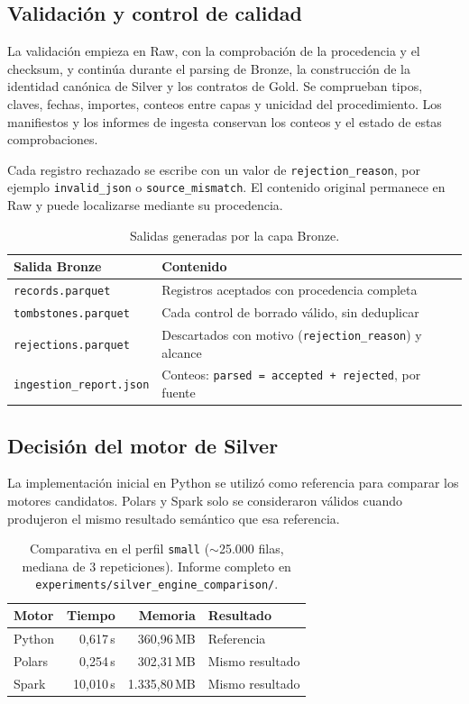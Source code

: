 \documentclass[11pt,a4paper]{article}
\newcommand{\cabecera}[1]{{\bfseries #1}}
\begin{document}
\subsection{Validación y control de calidad}

La validación empieza en Raw, con la comprobación de la procedencia y el
checksum, y continúa durante el parsing de Bronze, la construcción de la
identidad canónica de Silver y los contratos de Gold. Se comprueban tipos,
claves, fechas, importes, conteos entre capas y unicidad del procedimiento.
Los manifiestos y los informes de ingesta conservan los conteos y el estado de
estas comprobaciones.

Cada registro rechazado se escribe con un valor de
\texttt{rejection\_reason}, por ejemplo \texttt{invalid\_json} o
\texttt{source\_mismatch}. El contenido original permanece en Raw y puede
localizarse mediante su procedencia.

\begin{table}[H]
\centering
\small
\begin{tabularx}{\textwidth}{@{}l X@{}}
\toprule
\cabecera{Salida Bronze} & \cabecera{Contenido}\\
\midrule
\texttt{records.parquet} & Registros aceptados con procedencia completa\\
\texttt{tombstones.parquet} & Cada control de borrado válido, sin deduplicar\\
\texttt{rejections.parquet} & Descartados con motivo (\texttt{rejection\_reason}) y alcance\\
\texttt{ingestion\_report.json} & Conteos: \texttt{parsed = accepted + rejected}, por fuente\\
\bottomrule
\end{tabularx}
\caption{Salidas generadas por la capa Bronze.}
\end{table}

\subsection{Decisión del motor de Silver}

La implementación inicial en Python se utilizó como referencia para comparar
los motores candidatos. Polars y Spark solo se consideraron válidos cuando
produjeron el mismo resultado semántico que esa referencia.

\begin{table}[ht]
\centering
\small
\begin{tabular}{@{}l r r l@{}}
\toprule
\cabecera{Motor} & \cabecera{Tiempo} & \cabecera{Memoria} & \cabecera{Resultado}\\
\midrule
Python & 0,617\,s & 360,96\,MB & Referencia\\
Polars & 0,254\,s & 302,31\,MB & Mismo resultado\\
Spark & 10,010\,s & 1.335,80\,MB & Mismo resultado\\
\bottomrule
\end{tabular}
\caption{Comparativa en el perfil \texttt{small} ($\sim$25.000 filas, mediana
de 3 repeticiones). Informe completo en
\texttt{experiments/silver\_engine\_comparison/}.}
\end{table}
\end{document}
